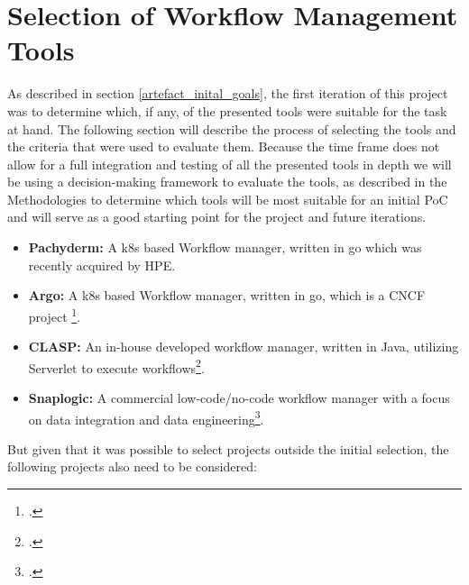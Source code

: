 \section{Selection of Workflow Management Tools}

As described in section \ref{artefact_inital_goals}, the first iteration of this project was to determine which, if any, of the presented tools were suitable for the task at hand.
The following section will describe the process of selecting the tools and the criteria that were used to evaluate them.
Because the time frame does not allow for a full integration and testing of all the presented tools in depth we will be using a decision-making framework to evaluate the tools,
as described in the Methodologies  to determine which tools will be most suitable for an initial \ac{PoC} and will serve as a good starting point for the project and future iterations.

\begin{itemize}
    \item \textbf{Pachyderm:} A \ac{k8s} based Workflow manager, written in go which was recently acquired by \ac{HPE}.
    \item \textbf{Argo:} A \ac{k8s} based Workflow manager, written in go, which is a \ac{CNCF} project \footcite{ArgoprojArgoworkflows2023}.
    \item \textbf{\ac{CLASP}:}  An in-house developed workflow manager, written in Java, utilizing Serverlet to execute workflows\footcite{sayersCloudApplicationServices2015}.
    \item \textbf{Snaplogic:} A commercial low-code/no-code workflow manager with a focus on data integration and data engineering\footcite{IPaaSSolutionEnterprise}.
\end{itemize}

But given that it was possible to select projects outside the initial selection, the following projects also need to be considered:


